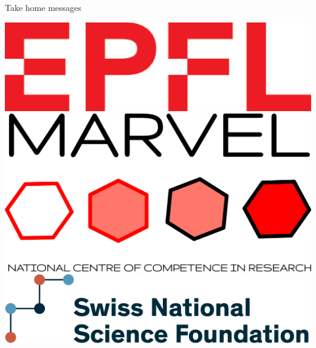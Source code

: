 \documentclass[xcolor=table,aspectratio=169]{beamer}
\numberwithin{equation}{section}
\begin{document}
\begin{frame}{Take home messages}
   \begin{center}
      \includegraphics[height=0.07\textheight]{logos/red_cropped.eps}
      \hspace{0.5em}
      \includegraphics[height=0.07\textheight]{figures/marvel_trimmed.png}
      \hspace{0.5em}
      \includegraphics[height=0.07\textheight]{logos/SNF_logo_standard_web_color_pos_e.png}
   \end{center}
\end{frame}
\end{document}
